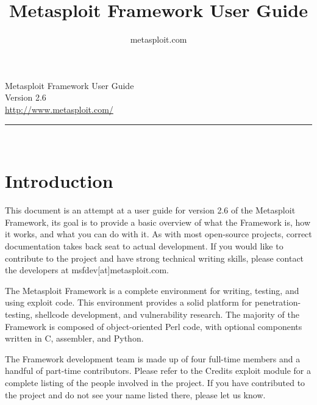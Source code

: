 \documentclass{report}
\begin{document}
\title{Metasploit Framework User Guide}
\author{metasploit.com}

\begin{titlepage}
    \begin{center}
        		

        \huge{Metasploit Framework User Guide}
		\ \\[10mm]
		\large{Version 2.6}
		\\[120mm]
		
        \small{\url{http://www.metasploit.com/}}

        \rule{10cm}{1pt} \\[4mm]
        \renewcommand{\arraystretch}{0.5}
    \end{center}
\end{titlepage}

\tableofcontents

\setlength{\parindent}{0pt} \setlength{\parskip}{8pt}



\chapter{Introduction}

\par
This document is an attempt at a user guide for version 2.6 of the Metasploit
Framework, its goal is to provide a basic overview of what the Framework is, how
it works, and what you can do with it. As with most open-source projects,
correct documentation takes back seat to actual development. If you would like
to contribute to the project and have strong technical writing skills, please
contact the developers at msfdev[at]metasploit.com.

\par
The Metasploit Framework is a complete environment for writing, testing, and
using exploit code. This environment provides a solid platform for
penetration-testing, shellcode development, and vulnerability research. The
majority of the Framework is composed of object-oriented Perl code, with
optional components written in C, assembler, and Python.  

\par
The Framework development team is made up of four full-time members and a handful
of part-time contributors. Please refer to the Credits exploit module for a complete
listing of the people involved in the project. If you have contributed to the project
and do not see your name listed there, please let us know.
\end{document}

